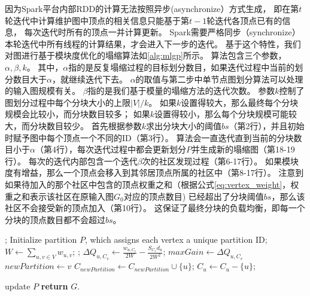 \documentclass[master]{njuthesis}
\begin{document}
因为Spark平台内部RDD的计算无法按照异步(asynchronize）方式生成，
即在第$t$轮迭代中计算维护图中顶点的相关信息只能基于第$t-1$轮迭代各顶点已有的信息，
每次迭代时所有的顶点一并计算更新。
Spark需要严格同步（synchronize）本轮迭代中所有线程的计算结果，才会进入下一步的迭代。
基于这个特性，我们对图进行基于模块度优化的塌缩算法如\ref{alg:mlgp}所示。
算法包含三个参数，$\alpha, \beta, k$。
其中，$\alpha$指的是反复塌缩过程的目标划分数目，如果迭代过程中当前的划分数目大于$\alpha$，就继续迭代下去。
$\alpha$的取值与第二步中单节点图划分算法可以处理的输入图规模有关。
$\beta$指的是我们基于模量的塌缩方法的迭代次数。
参数$k$控制了图划分过程中每个分块大小的上限$|V|/k$。
如果$k$设置得较大，那么最终每个分块规模会比较小，而分块数目较多；
如果$k$设置得较小，那么每个分块规模可能较大，而分块数目较少。
首先根据参数$k$求出分块大小的阈值$bs$（第2行），并且初始时赋予图中每个顶点一个不同的ID（第3行）。
算法会一直迭代直到当前的分块数目小于$\alpha$（第4行），每次迭代过程中都会更新划分$P$并生成新的塌缩图（第18-19行）。
每次的迭代内部包含一个迭代$\beta$次的社区发现过程（第6-17行）。
如果模块度有增益，那么一个顶点会移入到其邻居顶点所属的社区中（第8-17行）。
注意到如果待加入的那个社区中包含的顶点权重之和（根据公式\ref{eq:vertex_weight}，权重之和表示该社区在原输入图$G_0$对应的顶点数目)
已经超出了分块阈值$bs$，那么该社区不会接受新的顶点加入（第10行）。
这保证了最终分块的负载均衡，即每一个分块的顶点数目都不会超过$bs$。

\begin{algorithm}[h]
\label{alg:mlgp}
\begin{algorithmic}[1]
  ;
  \State Initialize partition $P$, which assigns each vertex a unique partition ID;
       
	  \State $W \gets \sum\nolimits_{u,v \in V} w_{u,v}$; 
		;
		   
		     \State $\Delta Q_{u,C_{v}} \gets \frac{w_{u,C_v}}{2W} - \frac{S_{C_v}d_u}{2W^2}$;
		      \State $maxGain \gets \Delta Q_{u,C_{v}}$
		      \State $newPartition \gets v$
		     \EndIf
		   \EndIf
		\EndFor
		    \State $C_{newPartition} \gets C_{newPartition}\cup\{u\}$;
		    \State $C_{u} \gets C_{u} - \{u\}$;
		    
		\EndIf	
	    \EndFor
	  \EndFor
	  \State update $P$
	\EndWhile
\State \textbf{return} $G$.
\EndProcedure
\end{algorithmic}
\end{algorithm}
\end{document}
